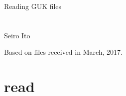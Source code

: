 




\setlength{\baselineskip}{12pt}





\hfil Reading GUK files\\

\hfil\MonthDY\\
\hfil{\footnotesize\currenttime}\\

\hfil Seiro Ito

\tableofcontents

\setlength{\parindent}{1em}

Based on files received in March, 2017.


\section{read}

